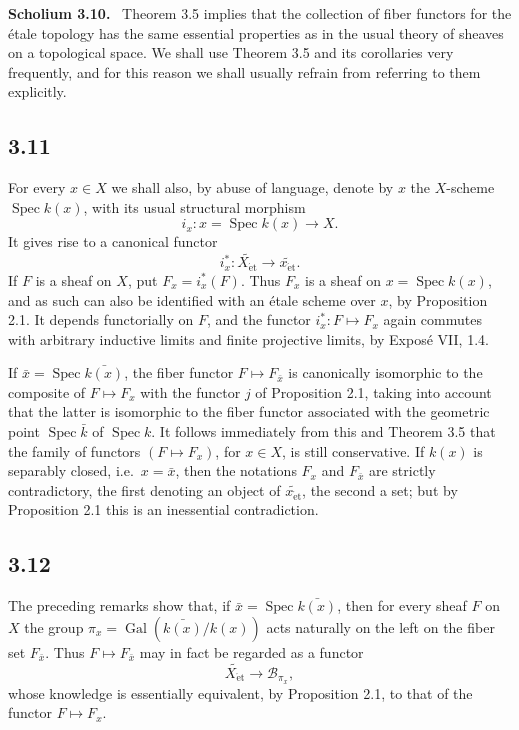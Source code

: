 \documentclass[11pt]{article}
\newcommand{\Bb}{\mathcal{B}}
\newcommand{\Spec}{\operatorname{Spec}}
\newcommand{\Gal}{\operatorname{Gal}}
\newcommand{\et}{\mathrm{\acute{e}t}}
\newcommand{\ie}{i.e.\ }
\newenvironment{remarktext}[1]{\par\medskip\noindent\textbf{#1.}\ }{\par\medskip}
\begin{document}
\begin{remarktext}{Scholium 3.10}
Theorem 3.5 implies that the collection of fiber functors for the \'etale topology has the same essential properties as in the usual theory of sheaves on a topological space. We shall use Theorem 3.5 and its corollaries very frequently, and for this reason we shall usually refrain from referring to them explicitly.
\end{remarktext}

\subsection*{3.11}
For every \(x\in X\) we shall also, by abuse of language, denote by \(x\) the \(X\)-scheme \(\Spec k(x)\), with its usual structural morphism
\[
i_x:x=\Spec k(x)\longrightarrow X.
\]
It gives rise to a canonical functor
\[
i_x^*:\widetilde{X_{\et}}\longrightarrow \widetilde{x_{\et}}.
\]
If \(F\) is a sheaf on \(X\), put \(F_x=i_x^*(F)\). Thus \(F_x\) is a sheaf on \(x=\Spec k(x)\), and as such can also be identified with an \'etale scheme over \(x\), by Proposition 2.1. It depends functorially on \(F\), and the functor \(i_x^*:F\mapsto F_x\) again commutes with arbitrary inductive limits and finite projective limits, by Expos\'e VII, 1.4.

If \(\bar x=\Spec\bar{k(x)}\), the fiber functor \(F\mapsto F_{\bar x}\) is canonically isomorphic to the composite of \(F\mapsto F_x\) with the functor \(j\) of Proposition 2.1, taking into account that the latter is isomorphic to the fiber functor associated with the geometric point \(\Spec\bar k\) of \(\Spec k\). It follows immediately from this and Theorem 3.5 that the family of functors \((F\mapsto F_x)\), for \(x\in X\), is still conservative. If \(k(x)\) is separably closed, \ie \(x=\bar x\), then the notations \(F_x\) and \(F_{\bar x}\) are strictly contradictory, the first denoting an object of \(\widetilde{x_{\et}}\), the second a set; but by Proposition 2.1 this is an inessential contradiction.

\subsection*{3.12}
The preceding remarks show that, if \(\bar x=\Spec\bar{k(x)}\), then for every sheaf \(F\) on \(X\) the group \(\pi_x=\Gal(\bar{k(x)}/k(x))\) acts naturally on the left on the fiber set \(F_{\bar x}\). Thus \(F\mapsto F_{\bar x}\) may in fact be regarded as a functor
\[
\widetilde{X_{\et}}\longrightarrow \Bb_{\pi_x},
\]
whose knowledge is essentially equivalent, by Proposition 2.1, to that of the functor \(F\mapsto F_x\).
\end{document}
